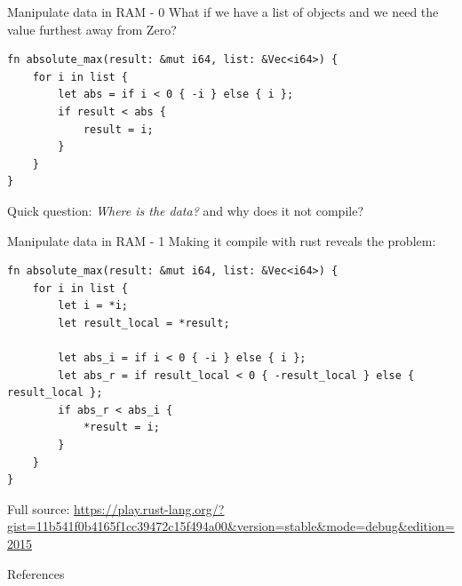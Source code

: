 \documentclass[10pt,aspectratio=169]{beamer}
\newcommand{\themename}{\textbf{\textsc{metropolis}}\xspace}
\begin{document}
\appendix

%
%


\begin{frame}[fragile]{Manipulate data in RAM - 0}
What if we have a list of objects and we need the value furthest away from Zero?
\begin{verbatim}
fn absolute_max(result: &mut i64, list: &Vec<i64>) {
    for i in list {
        let abs = if i < 0 { -i } else { i };
        if result < abs {
            result = i;
        }
    }
}
\end{verbatim}
Quick question: \emph{Where is the data?} and why does it \alert{not} compile?
\end{frame}

\begin{frame}[fragile]{Manipulate data in RAM - 1}
Making it compile with rust reveals the problem:
\begin{verbatim}
fn absolute_max(result: &mut i64, list: &Vec<i64>) {
    for i in list {
        let i = *i;
        let result_local = *result;

        let abs_i = if i < 0 { -i } else { i };
        let abs_r = if result_local < 0 { -result_local } else { result_local };
        if abs_r < abs_i {
            *result = i;
        }
    }
}
\end{verbatim}
Full source: \url{https://play.rust-lang.org/?gist=11b541f0b4165f1cc39472c15f494a00&version=stable&mode=debug&edition=2015}
\end{frame}

\begin{frame}[allowframebreaks]{References}

  
  

\end{frame}
\end{document}
